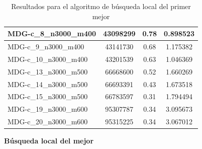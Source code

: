 \documentclass[11pt,a4paper]{article}
\begin{document}
\begin{table}[H]
\begin{center}
\begin{tabular}{|l|c|c|c|}
			MDG-c\_8\_n3000\_m400 & 43098299 & 0.78 & 0.898523 \\ \hline
			MDG-c\_9\_n3000\_m400 & 43141730 & 0.68 & 1.175382 \\ \hline
			MDG-c\_10\_n3000\_m400 & 43201539 & 0.63 & 1.046369 \\ \hline
			MDG-c\_13\_n3000\_m500 & 66668600 & 0.52 & 1.660269 \\ \hline
			MDG-c\_14\_n3000\_m500 & 66693391 & 0.43 & 1.673518 \\ \hline
			MDG-c\_15\_n3000\_m500 & 66783597 & 0.31 & 1.794494 \\ \hline
			MDG-c\_19\_n3000\_m600 & 95307787 & 0.34 & 3.095673 \\ \hline
			MDG-c\_20\_n3000\_m600 & 95315225 & 0.34 & 3.067012 \\ \hline
		\end{tabular}
	\end{center}
	\caption{Resultados para el algoritmo de búsqueda local del primer mejor}
	\label{}
\end{table}
\newpage
\textbf{Búsqueda local del mejor}
	
\end{document}
